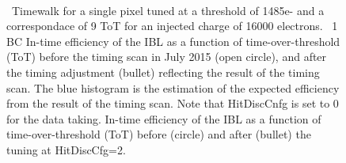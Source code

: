 \begin{figure}
\centering
{}
\\
\caption{\label{fig:ibl_timewalk}~Timewalk for a single pixel tuned at a threshold of 1485e- and a correspondace of 9 ToT for an injected charge of 16000 electrons. \label{fig:ibl_timing_efficienty}~1 BC In-time efficiency of the IBL as a function of time-over-threshold (ToT) before the timing scan in July 2015 (open circle), and after the timing adjustment (bullet) reflecting the result of the timing scan. The blue histogram is the estimation of the expected efficiency from the result of the timing scan. Note that HitDiscCnfg is set to 0 for the data taking. \label{fig:ibl_timing_final_efficiency}In-time efficiency of the IBL as a function of time-over-threshold (ToT) before (circle) and after (bullet) the tuning at HitDiscCfg=2.}
\end{figure}
